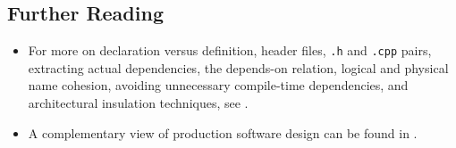 \subsection[Further Reading]{Further Reading}\label{further-reading}

\begin{itemize}
\item{For more on declaration versus definition, header files,  \lstinline!.h! and \lstinline!.cpp! pairs, extracting actual dependencies, the depends-on relation, logical and physical name cohesion, avoiding unnecessary compile-time dependencies, and architectural insulation techniques, see \cite{lakos20}.}
\item{A complementary view of production software design can be found in \cite{martin17}.}
\end{itemize}

